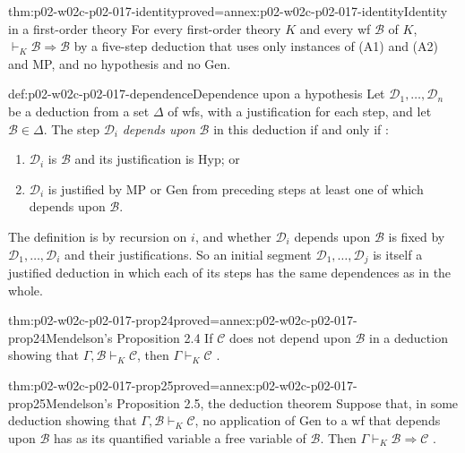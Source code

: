 \begin{hblemma}{thm:p02-w02c-p02-017-identity}{proved=annex:p02-w02c-p02-017-identity}{Identity in a first-order theory}
For every first-order theory \(K\) and every wf \(\mathscr B\) of \(K\),
\(\vdash_K\mathscr B\Rightarrow\mathscr B\) by a five-step deduction that
uses only instances of (A1) and (A2) and MP, and no hypothesis and no Gen.
\end{hblemma}

\begin{hbdefinition}{def:p02-w02c-p02-017-dependence}{Dependence upon a hypothesis}
Let \(\mathscr D_1,\ldots,\mathscr D_n\) be a deduction from a set \(\Delta\)
of wfs, with a justification for each step, and let \(\mathscr B\in\Delta\).
The step \(\mathscr D_i\) \emph{depends upon} \(\mathscr B\) in this deduction
if and only if \cite[\S 2.4, p.~73]{Mendelson1997}:
\begin{enumerate}
  \item \(\mathscr D_i\) is \(\mathscr B\) and its justification is Hyp; or
  \item \(\mathscr D_i\) is justified by MP or Gen from preceding steps at
        least one of which depends upon \(\mathscr B\).
\end{enumerate}
The definition is by recursion on \(i\), and whether \(\mathscr D_i\)
depends upon \(\mathscr B\) is fixed by \(\mathscr D_1,\ldots,\mathscr D_i\)
and their justifications.  So an initial segment
\(\mathscr D_1,\ldots,\mathscr D_j\) is itself a justified deduction in
which each of its steps has the same dependences as in the whole.
\end{hbdefinition}

\begin{hbtheorem}{thm:p02-w02c-p02-017-prop24}{proved=annex:p02-w02c-p02-017-prop24}{Mendelson's Proposition 2.4}
If \(\mathscr C\) does not depend upon \(\mathscr B\) in a deduction showing
that \(\Gamma,\mathscr B\vdash_K\mathscr C\), then
\(\Gamma\vdash_K\mathscr C\) \cite[\S 2.4, p.~74]{Mendelson1997}.
\end{hbtheorem}

\begin{hbtheorem}{thm:p02-w02c-p02-017-prop25}{proved=annex:p02-w02c-p02-017-prop25}{Mendelson's Proposition 2.5, the deduction theorem}
Suppose that, in some deduction showing that
\(\Gamma,\mathscr B\vdash_K\mathscr C\), no application of Gen to a wf that
depends upon \(\mathscr B\) has as its quantified variable a free variable of
\(\mathscr B\).  Then \(\Gamma\vdash_K\mathscr B\Rightarrow\mathscr C\)
\cite[\S 2.4, p.~74]{Mendelson1997}.
\end{hbtheorem}

